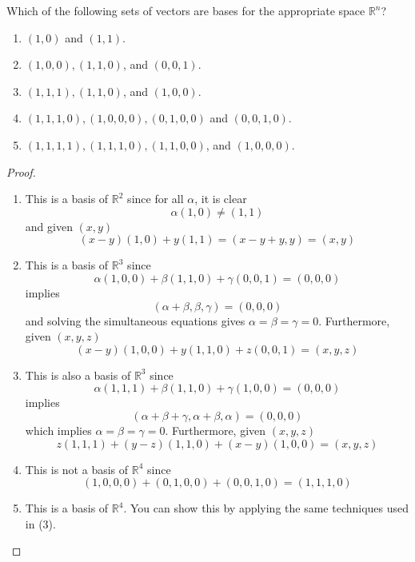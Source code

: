     \question Which of the following sets of vectors are bases for the appropriate space \( \mathbb{R}^n \)?
    \begin{enumerate}
        \item \( (1,0) \) and \( (1,1) \).
        
        \item \( (1,0,0), (1,1,0) \), and \( (0,0,1) \).
        
        \item \( (1,1,1), (1,1,0)\), and \( (1,0,0) \).
        
        \item \( (1,1,1,0), (1,0,0,0), (0,1,0,0) \) and \( (0,0,1,0) \).
        
        \item \( (1,1,1,1), (1,1,1,0), (1,1,0,0) \), and \( (1,0,0,0) \).
    \end{enumerate}
    \begin{proof}
        \begin{enumerate}
            \item This is a basis of \( \mathbb{R}^2 \) since for all \( \alpha \), it is clear
            \[
            \alpha(1,0) \neq (1,1)
            \]
            and given \( (x,y) \)
            \[
            (x-y)(1,0) +y(1,1) = (x-y+y,y) = (x,y)
            \]
            
            \item This is a basis of \( \mathbb{R}^3 \) since
            \[
            \alpha(1,0,0)+\beta(1,1,0)+\gamma(0,0,1) = (0,0,0)
            \]
            implies
            \[
            (\alpha+\beta,\beta,\gamma) = (0,0,0)
            \]
            and solving the simultaneous equations gives \( \alpha=\beta=\gamma =0 \). Furthermore, given \( (x,y,z) \)
            \[
            (x-y)(1,0,0)+y(1,1,0)+z(0,0,1) = (x,y,z)
            \]
            
            \item This is also a basis of \( \mathbb{R}^3 \) since
            \[
            \alpha(1,1,1)+\beta(1,1,0)+\gamma(1,0,0) = (0,0,0)
            \]
            implies
            \[
            (\alpha+\beta+\gamma, \alpha+\beta, \alpha) = (0,0,0)
            \]
            which implies \( \alpha=\beta=\gamma=0 \). Furthermore, given \( (x,y,z) \)
            \[
            z(1,1,1)+(y-z)(1,1,0)+(x-y)(1,0,0) = (x,y,z)
            \]
            
            \item This is not a basis of \( \mathbb{R}^4 \) since
            \[
            (1,0,0,0)+(0,1,0,0)+(0,0,1,0)=(1,1,1,0)
            \]
            
            \item This is a basis of \( \mathbb{R}^4 \). You can show this by applying the same techniques used in (3).
        \end{enumerate}
    \end{proof}
    

